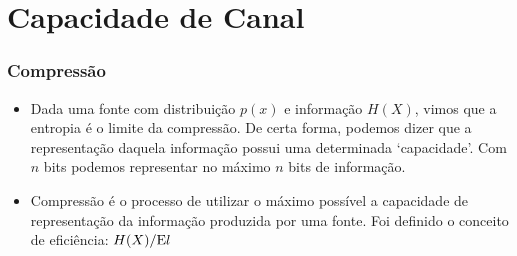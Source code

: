 \section{Capacidade de Canal}

\begin{frame}[allowframebreaks]
  \frametitle{Compressão}
  \begin{itemize}
  \item Dada uma fonte com distribuição $p(x)$ e informação $H(X)$, vimos que a entropia é o limite
	da compressão. De certa forma, podemos dizer que a representação daquela informação possui uma 
	determinada `capacidade'. Com $n$ bits podemos representar no máximo $n$ bits de informação.
  \item Compressão é o processo de utilizar o máximo possível a capacidade de representação da
	informação produzida por uma fonte. Foi definido o conceito de eficiência: $H(X) / \mathrm{E} l$ 
  \end{itemize}
\end{frame}

